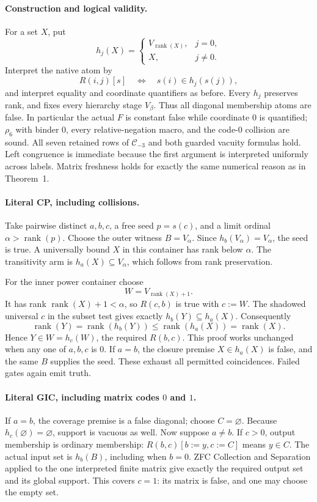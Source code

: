\paragraph{Construction and logical validity.}
For a set $X$, put
\[
 h_j(X)=
 \begin{cases}
 V_{\operatorname{rank}(X)},&j=0,\\
 X,&j\ne0.
 \end{cases}
\]
Interpret the native atom by
\[
 R(i,j)[s]\quad\Longleftrightarrow\quad s(i)\in h_j(s(j)),
\]
and interpret equality and coordinate quantifiers as before.
Every $h_j$ preserves rank, and fixes every hierarchy stage $V_\beta$.
Thus all diagonal membership atoms are false. In particular the actual
$F$ is constant false while coordinate $0$ is quantified; $\rho_6$ with
binder $0$, every relative-negation macro, and the code-$0$ collision
are sound. All seven retained rows of $\mathcal C_{-3}$ and both guarded
vacuity formulas hold. Left congruence is immediate because the first
argument is interpreted uniformly across labels. Matrix freshness holds
for exactly the same numerical reason as in Theorem~1.

\paragraph{Literal CP, including collisions.}
Take pairwise distinct $a,b,c$, a free seed $p=s(c)$, and a limit ordinal
$\alpha>\operatorname{rank}(p)$. Choose the outer witness $B=V_\alpha$.
Since $h_b(V_\alpha)=V_\alpha$, the seed is true. A universally bound
$X$ in this container has rank below $\alpha$. The transitivity arm is
$h_a(X)\subseteq V_\alpha$, which follows from rank preservation.

For the inner power container choose
\[
 W=V_{\operatorname{rank}(X)+1}.
\]
It has rank $\operatorname{rank}(X)+1<\alpha$, so $R(c,b)$ is true
with $c:=W$. The shadowed universal $c$ in the subset test gives
exactly $h_b(Y)\subseteq h_a(X)$. Consequently
\[
 \operatorname{rank}(Y)=\operatorname{rank}(h_b(Y))
 \leq\operatorname{rank}(h_a(X))=\operatorname{rank}(X).
\]
Hence $Y\in W=h_c(W)$, the required $R(b,c)$. This proof works
unchanged when any one of $a,b,c$ is $0$. If $a=b$, the closure premise
$X\in h_a(X)$ is false, and the same $B$ supplies the seed. These
exhaust all permitted coincidences. Failed gates again emit truth.

\paragraph{Literal GIC, including matrix codes $0$ and $1$.}
If $a=b$, the coverage premise is a false diagonal; choose $C=\varnothing$.
Because $h_c(\varnothing)=\varnothing$, support is vacuous as well.
Now suppose $a\ne b$. If $c>0$, output membership is ordinary membership:
$R(b,c)[b:=y,c:=C]$ means $y\in C$. The actual input set is
$h_b(B)$, including when $b=0$. ZFC Collection and Separation applied
to the one interpreted finite matrix give exactly the required output
set and its global support. This covers $c=1$: its matrix is false,
and one may choose the empty set.

